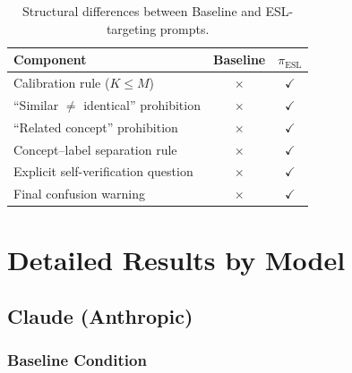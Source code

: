 \begin{table}[h]
\centering
\small
\begin{tabular}{lcc}
\toprule
\textbf{Component} & \textbf{Baseline} & \textbf{$\pi_{\text{ESL}}$} \\
\midrule
Calibration rule ($K \leq M$) & $\times$ & $\checkmark$ \\
``Similar $\neq$ identical'' prohibition & $\times$ & $\checkmark$ \\
``Related concept'' prohibition & $\times$ & $\checkmark$ \\
Concept--label separation rule & $\times$ & $\checkmark$ \\
Explicit self-verification question & $\times$ & $\checkmark$ \\
Final confusion warning & $\times$ & $\checkmark$ \\
\bottomrule
\end{tabular}
\caption{Structural differences between Baseline and ESL-targeting prompts.}
\label{tab:prompt-diff}
\end{table}


\section{Detailed Results by Model}
\label{app:results}

\subsection{Claude (Anthropic)}

\subsubsection{Baseline Condition}

